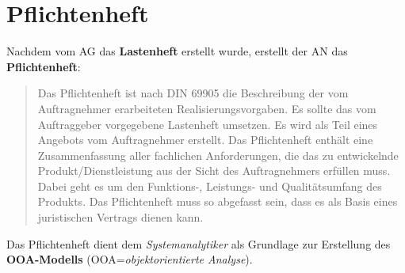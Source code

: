 \section{Pflichtenheft}

\begin{tcolorbox}[title=Pflichenheft]
    Nachdem vom AG das \textbf{Lastenheft} erstellt wurde, erstellt der AN das \textbf{Pflichtenheft}:
    \blockquote[{\cite[306]{AABG14m}}]{
        Das Pflichtenheft ist nach DIN 69905 die Beschreibung der vom Auftragnehmer erarbeiteten Realisierungsvorgaben. Es sollte das vom Auftraggeber vorgegebene
        Lastenheft umsetzen. Es wird als Teil eines Angebots vom Auftragnehmer erstellt.
        Das Pflichtenheft enthält eine Zusammenfassung aller fachlichen Anforderungen,
        die das zu entwickelnde Produkt/Dienstleistung aus der Sicht des Auftragnehmers
        erfüllen muss. Dabei geht es um den Funktions-, Leistungs- und Qualitätsumfang
        des Produkts. Das Pflichtenheft muss so abgefasst sein, dass es als Basis eines juristischen Vertrags dienen kann.
    }
    \noindent
    Das Pflichtenheft dient dem \textit{Systemanalytiker} als Grundlage zur Erstellung des \textbf{OOA-Modells} (OOA=\textit{objektorientierte Analyse}).
\end{tcolorbox}
